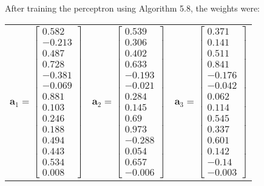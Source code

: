 \documentclass{article}
\newcommand{\mbf}[1]{\ensuremath{\mathbf{#1}}}
\begin{document}
After training the perceptron using Algorithm 5.8, the weights were:
\begin{center}
\begin{tabular}{ ccc }
$\mbf{a}_1 = \left[\begin{matrix}
    0.582 \\
    -0.213 \\
    0.487 \\
    0.728 \\
    -0.381 \\
    -0.069 \\
    0.881 \\
    0.103 \\
    0.246 \\
    0.188 \\
    0.494 \\
    0.443 \\
    0.534 \\
    0.008
\end{matrix}\right]$ & 
$\mbf{a}_2 = \left[\begin{matrix}
    0.539 \\
    0.306 \\
    0.402 \\
    0.633 \\
    -0.193 \\
    -0.021 \\
    0.284 \\
    0.145 \\
    0.69  \\
    0.973 \\
    -0.288 \\
    0.054 \\
    0.657 \\
    -0.006
\end{matrix}\right]$ & 
$\mbf{a}_3 = \left[\begin{matrix}
    0.371 \\
    0.141 \\
    0.511 \\
    0.841 \\
    -0.176 \\
    -0.042 \\
    0.062 \\
    0.114 \\
    0.545 \\
    0.337 \\
    0.601 \\
    0.142 \\
    -0.14  \\
    -0.003
\end{matrix}\right]$
\end{tabular}
\end{center}
\end{document}
